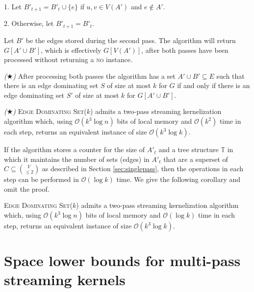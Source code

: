 \documentclass[draft,a4paper]{llncs}
\newcommand{\Oh}{\mathcal{O}}
\newcommand{\no}{\textsc{no}\xspace}
\newcommand{\EDSk}{\textsc{Edge Dominating Set($k$)}\xspace}
\begin{document}
\smallskip

 1. Let $B'_{t+1} = B'_t \cup \{e\}$ if $u, v \in V(A')$ and $e \notin A'$.
 
 2. Otherwise, let $B'_{t+1} = B'_t$.
 
 \smallskip

\noindent Let $B'$ be the edges stored during the second pass. The algorithm will return $G[A' \cup B']$, which is effectively $G[V(A')]$, after both passes have been 
processed without returning a \no instance.

\begin{lemma}\label{lem:eds} \emph{($\bigstar$)}
 After processing both passes the algorithm has a set $A' \cup B' \subseteq E$ such that there is an edge dominating set 
 $S$ of size at most $k$ for $G$ if and only if there is an edge dominating set $S'$ of size at most $k$ for $G[A' \cup B']$.
\end{lemma}

\begin{theorem} \label{thm:2pass} \emph{($\bigstar$)}
 \EDSk admits a two-pass streaming kernelization algorithm which, using $\Oh(k^3 \log n)$ bits of local memory and
 $\Oh(k^2)$ time in each step, returns an equivalent instance of size $\Oh(k^3 \log k)$.
\end{theorem}
  
If the algorithm stores a counter for the size of $A'_t$ and a tree structure $\mathbb{T}$ in which it maintains the number of sets (edges) in $A'_t$ that are a superset of $C \subseteq \binom{V}{\leq 2}$ as described in Section \ref{sec:singlepass}, then the operations in each step can be performed in $\Oh(\log k)$ time. We give the following corollary and omit the proof.

\begin{corollary}
 \EDSk admits a two-pass streaming kernelization algorithm which, using $\Oh(k^3 \log n)$ bits of local memory and $\Oh(\log k)$ time in each step, returns an equivalent instance of size $\Oh(k^3 \log k)$.
\end{corollary}


\section{Space lower bounds for multi-pass streaming kernels}\label{sec:multi}
\end{document}
